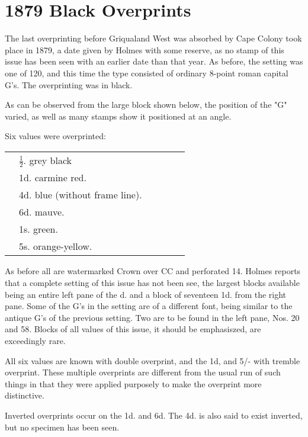 \chapter{1879 Black Overprints}    
The last overprinting before Griqualand West was absorbed by Cape Colony took place
in 1879, a date given by Holmes with some reserve, as no stamp of this issue has been seen with an earlier date than that year. As before, the setting was one of 120, and this time the type consisted of ordinary 8-point roman capital G's. The overprinting was in black.

As can be observed from the large block shown below, the position of the "G" varied, as well as many stamps show it positioned at an angle.


Six values were overprinted:

\begin{tabular}{llllll}
 &$\frac{1}{2}$. grey black & & & &\\
 &1d. carmine red.& & & &\\
 &4d. blue (without frame line).& & & &\\
 &6d. mauve.& & & &\\
 &1s. green.& & & &\\
 &5s. orange-yellow.& & & &\\
\end{tabular}

As before all are watermarked Crown over CC and perforated 14. Holmes reports that a complete setting of this issue has not been see, the largest blocks available being an entire left pane of the \half d. and a block of seventeen 1d. from the right pane. Some of the G's in the setting are of a different font, being similar to the antique G's of the previous setting. Two are to be found in the left pane, Nos. 20 and 58. Blocks of all values of this issue, it should be emphasiszed, are exceedingly rare.

All six values are known with double overprint, and the 1d, and 5/- with tremble overprint. These multiple overprints are different from the usual run of such things in that they were applied purposely to make the overprint more distinctive.


Inverted overprints occur on the 1d. and 6d. The 4d. is also said to exist inverted, but no specimen has been seen.




          